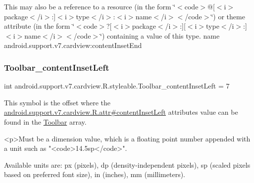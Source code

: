 This may also be a reference to a resource (in the form \char`\"{}$<$code$>$@\mbox{[}$<$i$>$package$<$/i$>$\+:\mbox{]}$<$i$>$type$<$/i$>$\+:$<$i$>$name$<$/i$>$$<$/code$>$\char`\"{}) or theme attribute (in the form \char`\"{}$<$code$>$?\mbox{[}$<$i$>$package$<$/i$>$\+:\mbox{]}\mbox{[}$<$i$>$type$<$/i$>$\+:\mbox{]}$<$i$>$name$<$/i$>$$<$/code$>$\char`\"{}) containing a value of this type.  name android.\+support.\+v7.\+cardview\+:content\+Inset\+End \mbox{\label{classandroid_1_1support_1_1v7_1_1cardview_1_1R_1_1styleable_afa00957dff7d0d6a25908e2bb3a2b56c}} 
\subsubsection{\texorpdfstring{Toolbar\+\_\+content\+Inset\+Left}{Toolbar\_contentInsetLeft}}
{\footnotesize\ttfamily int android.\+support.\+v7.\+cardview.\+R.\+styleable.\+Toolbar\+\_\+content\+Inset\+Left = 7\hspace{0.3cm}{\ttfamily [static]}}

This symbol is the offset where the \hyperlink{classandroid_1_1support_1_1v7_1_1cardview_1_1R_1_1attr_ac9a3713dc1e40a5608dcb7bf6b36f4a7}{android.\+support.\+v7.\+cardview.\+R.\+attr\#content\+Inset\+Left} attribute\textquotesingle{}s value can be found in the \hyperlink{classandroid_1_1support_1_1v7_1_1cardview_1_1R_1_1styleable_a26149aeb8fd339abe09ecc9d92b9304f}{Toolbar} array.

\begin{DoxyVerb}      <p>Must be a dimension value, which is a floating point number appended with a unit such as "<code>14.5sp</code>".
\end{DoxyVerb}
 Available units are\+: px (pixels), dp (density-\/independent pixels), sp (scaled pixels based on preferred font size), in (inches), mm (millimeters). 

